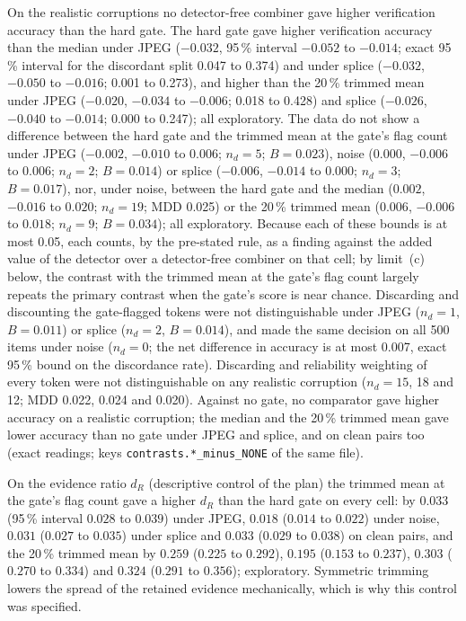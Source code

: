 On the realistic corruptions no detector-free combiner gave higher verification accuracy than the hard gate.
The hard gate gave higher verification accuracy than the median under JPEG ($-0.032$, 95\,\% interval $-0.052$ to $-0.014$; exact
95\,\% interval for the discordant split 0.047 to 0.374) and under splice ($-0.032$, $-0.050$ to $-0.016$; 0.001 to 0.273), and higher
than the 20\,\% trimmed mean under JPEG ($-0.020$, $-0.034$ to $-0.006$; 0.018 to 0.428) and splice ($-0.026$, $-0.040$ to $-0.014$;
0.000 to 0.247); all exploratory.
The data do not show a difference between the hard gate and the trimmed mean at the gate's flag count under JPEG ($-0.002$, $-0.010$ to
$0.006$; $n_d=5$; $B=0.023$), noise ($0.000$, $-0.006$ to $0.006$; $n_d=2$; $B=0.014$) or splice ($-0.006$, $-0.014$ to $0.000$; $n_d=3$;
$B=0.017$), nor, under noise, between the hard gate and the median ($0.002$, $-0.016$ to $0.020$; $n_d=19$; MDD 0.025) or the 20\,\%
trimmed mean ($0.006$, $-0.006$ to $0.018$; $n_d=9$; $B=0.034$); all exploratory.
Because each of these bounds is at most 0.05, each counts, by the pre-stated rule, as a finding against the added value of the detector
over a detector-free combiner on that cell; by limit~(c) below, the contrast with the trimmed mean at the gate's flag count largely
repeats the primary contrast when the gate's score is near chance.
Discarding and discounting the gate-flagged tokens were not distinguishable under JPEG ($n_d=1$, $B=0.011$) or splice ($n_d=2$,
$B=0.014$), and made the same decision on all 500 items under noise ($n_d=0$; the net difference in accuracy is at most 0.007, exact
95\,\% bound on the discordance rate).
Discarding and reliability weighting of every token were not distinguishable on any realistic corruption ($n_d=15$, 18 and 12; MDD 0.022,
0.024 and 0.020).
Against no gate, no comparator gave higher accuracy on a realistic corruption; the median and the 20\,\% trimmed mean gave lower
accuracy than no gate under JPEG and splice, and on clean pairs too (exact readings; keys \nolinkurl{contrasts.*_minus_NONE} of the
same file).

On the evidence ratio $d_R$ (descriptive control of the plan) the trimmed mean at the gate's flag count gave a higher $d_R$ than the
hard gate on every cell: by $0.033$ (95\,\% interval $0.028$ to $0.039$) under JPEG, $0.018$ ($0.014$ to $0.022$) under noise, $0.031$
($0.027$ to $0.035$) under splice and $0.033$ ($0.029$ to $0.038$) on clean pairs, and the 20\,\% trimmed mean by $0.259$ ($0.225$ to
$0.292$), $0.195$ ($0.153$ to $0.237$), $0.303$ ($0.270$ to $0.334$) and $0.324$ ($0.291$ to $0.356$); exploratory.
Symmetric trimming lowers the spread of the retained evidence mechanically, which is why this control was specified.

